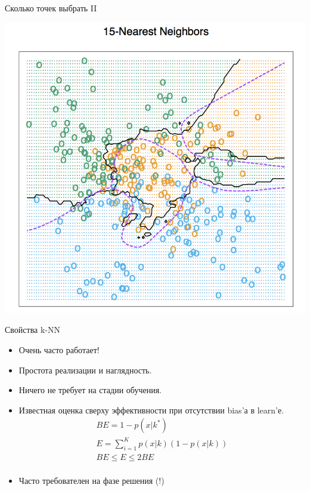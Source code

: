 \documentclass[14pt, fleqn, xcolor={dvipsnames, table}]{beamer}
\begin{document}
\begin{frame}{Сколько точек выбрать II}
\begin{center}
\includegraphics[height=0.8\textheight]{13_3_1.png}
\end{center}
\end{frame}


\begin{frame}{Свойства k-NN}
  \begin{itemize}
    \item Очень часто работает! 
    \item Простота реализации и наглядность.
    \item Ничего не требует на стадии обучения.
    \item Известная оценка сверху эффективности при отсутствии bias'а в learn'е. \\
    $$
      \begin{array}{l}
      BE = 1 - p(x|k^*) \\
      E = \sum_{i=1}^Kp(x|k)(1-p(x|k)) \\
      BE \le E \le 2BE \\
      \end{array}
    $$
    \item Часто требователен на фазе решения (!)
  \end{itemize}
\end{frame}
\end{document}

